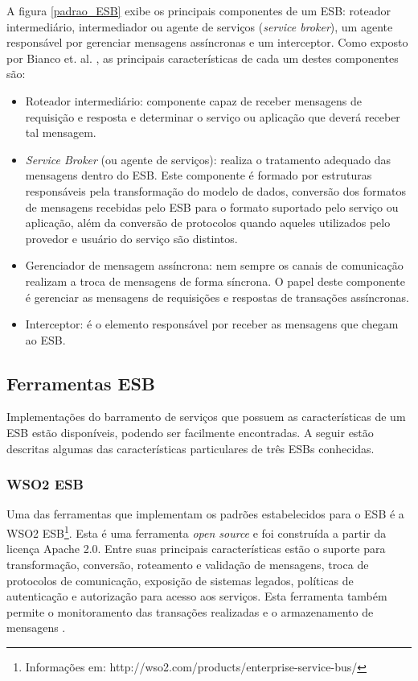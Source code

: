 A figura \ref{padrao_ESB} exibe os principais componentes de um ESB: roteador intermediário, intermediador ou agente de serviços (\textit{service broker}), um agente responsável por gerenciar mensagens assíncronas e um interceptor. Como exposto por Bianco et. al. \cite{bianco_architecting_2011}, as principais características de cada um destes componentes são:

\begin{itemize}

\item Roteador intermediário: componente capaz de receber mensagens de requisição e resposta e determinar o serviço ou aplicação que deverá receber tal mensagem.

\item \textit{Service Broker} (ou agente de serviços): realiza o tratamento adequado das mensagens dentro do ESB. Este componente é formado por estruturas responsáveis pela transformação do modelo de dados, conversão dos formatos de mensagens recebidas pelo ESB para o formato suportado pelo serviço ou aplicação, além da conversão de protocolos quando aqueles utilizados pelo provedor e usuário do serviço são distintos.

\item Gerenciador de mensagem assíncrona: nem sempre os canais de comunicação realizam a troca de mensagens de forma síncrona. O papel deste componente é gerenciar as mensagens de requisições e respostas de transações assíncronas.

\item Interceptor: é o elemento responsável por receber as mensagens que chegam ao ESB.
\end{itemize}

\subsection{Ferramentas ESB}

Implementações do barramento de serviços que possuem as características de um ESB estão disponíveis, podendo ser facilmente encontradas. A seguir estão descritas algumas das características particulares de três ESBs conhecidas.

\subsubsection{WSO2 ESB}
Uma das ferramentas que implementam os padrões estabelecidos para o ESB é a WSO2 ESB\footnote{Informações em: http://wso2.com/products/enterprise-service-bus/}. Esta é uma ferramenta \textit{open source} e foi construída a partir da licença Apache 2.0. Entre suas principais características estão o suporte para transformação, conversão, roteamento e validação de mensagens, troca de protocolos de comunicação, exposição de sistemas legados, políticas de autenticação e autorização para acesso aos serviços. Esta ferramenta também permite o monitoramento das transações realizadas e o armazenamento de mensagens \cite{siriwardena_enterprise_2013}.

